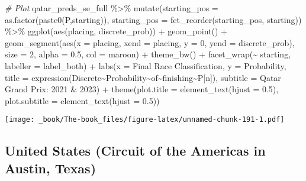 \documentclass[
]{book}
\newenvironment{Shaded}{\begin{snugshade}}{\end{snugshade}}
\newcommand{\AttributeTok}[1]{\textcolor[rgb]{0.77,0.63,0.00}{#1}}
\newcommand{\CommentTok}[1]{\textcolor[rgb]{0.56,0.35,0.01}{\textit{#1}}}
\newcommand{\DecValTok}[1]{\textcolor[rgb]{0.00,0.00,0.81}{#1}}
\newcommand{\FloatTok}[1]{\textcolor[rgb]{0.00,0.00,0.81}{#1}}
\newcommand{\FunctionTok}[1]{\textcolor[rgb]{0.00,0.00,0.00}{#1}}
\newcommand{\NormalTok}[1]{#1}
\newcommand{\SpecialCharTok}[1]{\textcolor[rgb]{0.00,0.00,0.00}{#1}}
\newcommand{\StringTok}[1]{\textcolor[rgb]{0.31,0.60,0.02}{#1}}
\begin{document}
\begin{Shaded}
\begin{Highlighting}[]
\CommentTok{\# Plot}
\NormalTok{qatar\_preds\_se\_full }\SpecialCharTok{\%\textgreater{}\%}
  \FunctionTok{mutate}\NormalTok{(}\AttributeTok{starting\_pos =} \FunctionTok{as.factor}\NormalTok{(}\FunctionTok{paste0}\NormalTok{(}\StringTok{\textquotesingle{}P\textquotesingle{}}\NormalTok{,starting)),}
         \AttributeTok{starting\_pos =} \FunctionTok{fct\_reorder}\NormalTok{(starting\_pos, starting)) }\SpecialCharTok{\%\textgreater{}\%}
  \FunctionTok{ggplot}\NormalTok{(}\FunctionTok{aes}\NormalTok{(placing, discrete\_prob)) }\SpecialCharTok{+}
  \FunctionTok{geom\_point}\NormalTok{() }\SpecialCharTok{+}
  \FunctionTok{geom\_segment}\NormalTok{(}\FunctionTok{aes}\NormalTok{(}\AttributeTok{x =}\NormalTok{ placing, }\AttributeTok{xend =}\NormalTok{ placing, }\AttributeTok{y =} \DecValTok{0}\NormalTok{, }\AttributeTok{yend =}\NormalTok{ discrete\_prob),}
               \AttributeTok{size =} \DecValTok{2}\NormalTok{, }\AttributeTok{alpha =} \FloatTok{0.5}\NormalTok{, }\AttributeTok{col =} \StringTok{\textquotesingle{}maroon\textquotesingle{}}\NormalTok{) }\SpecialCharTok{+}
  \FunctionTok{theme\_bw}\NormalTok{() }\SpecialCharTok{+}
  \FunctionTok{facet\_wrap}\NormalTok{(}\SpecialCharTok{\textasciitilde{}}\NormalTok{ starting, }\AttributeTok{labeller =}\NormalTok{ label\_both) }\SpecialCharTok{+}
  \FunctionTok{labs}\NormalTok{(}\AttributeTok{x =} \StringTok{\textquotesingle{}Final Race Classification\textquotesingle{}}\NormalTok{,}
       \AttributeTok{y =} \StringTok{\textquotesingle{}Probability\textquotesingle{}}\NormalTok{,}
       \AttributeTok{title =} \FunctionTok{expression}\NormalTok{(Discrete}\SpecialCharTok{\textasciitilde{}}\NormalTok{Probability}\SpecialCharTok{\textasciitilde{}}\NormalTok{of}\SpecialCharTok{\textasciitilde{}}\NormalTok{finishing}\SpecialCharTok{\textasciitilde{}}\NormalTok{P[n]),}
       \AttributeTok{subtitle =} \StringTok{\textquotesingle{}Qatar Grand Prix: 2021 \& 2023\textquotesingle{}}\NormalTok{) }\SpecialCharTok{+}
  \FunctionTok{theme}\NormalTok{(}\AttributeTok{plot.title =} \FunctionTok{element\_text}\NormalTok{(}\AttributeTok{hjust =} \FloatTok{0.5}\NormalTok{),}
        \AttributeTok{plot.subtitle =} \FunctionTok{element\_text}\NormalTok{(}\AttributeTok{hjust =} \FloatTok{0.5}\NormalTok{)) }
\end{Highlighting}
\end{Shaded}

\texttt{[image: \_book/The-book\_files/figure-latex/unnamed-chunk-191-1.pdf]}

\hypertarget{united-states-circuit-of-the-americas-in-austin-texas}{%
\subsection{United States (Circuit of the Americas in Austin, Texas)}\label{united-states-circuit-of-the-americas-in-austin-texas}}
\end{document}

